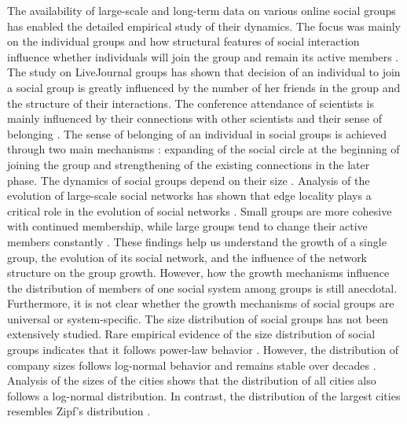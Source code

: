 The availability of large-scale and long-term data on various online social groups has enabled the detailed empirical study of their dynamics. The focus was mainly on the individual groups and how structural features of social interaction influence whether individuals will join the group \cite{backstrom2006group} and remain its active members \cite{smiljanic2016theoretical, smiljanic2017associative}. The study on LiveJournal \cite{backstrom2006group} groups has shown that decision of an individual to join a social group is greatly influenced by the number of her friends in the group and the structure of their interactions. The conference attendance of scientists is mainly influenced by their connections with other scientists and their sense of belonging \cite{smiljanic2016theoretical}. The sense of belonging of an individual in social groups is achieved through two main mechanisms \cite{smiljanic2017associative}: expanding of the social circle at the beginning of joining the group and strengthening of the existing connections in the later phase. The dynamics of social groups depend on their size \cite{}. Analysis of the evolution of large-scale social networks has shown that edge locality plays a critical role in the evolution of social networks \cite{leskovec2008microscopic}. Small groups are more cohesive with continued membership, while large groups tend to change their active members constantly \cite{PNAS}. These findings help us understand the growth of a single group, the evolution of its social network, and the influence of the network structure on the group growth. However, how the growth mechanisms influence the distribution of members of one social system among groups is still anecdotal.\\

Furthermore, it is not clear whether the growth mechanisms of social groups are universal or system-specific. The size distribution of social groups has not been extensively studied. Rare empirical evidence of the size distribution of social groups indicates that it follows power-law behavior \cite{zheleva2009co}. However, the distribution of company sizes follows log-normal behavior and remains stable over decades \cite{amaral1997scaling, stanley1996scaling}. Analysis of the sizes of the cities shows that the distribution of all cities also follows a log-normal distribution. In contrast, the distribution of the largest cities resembles Zipf's distribution \cite{fazio2015pareto}.

